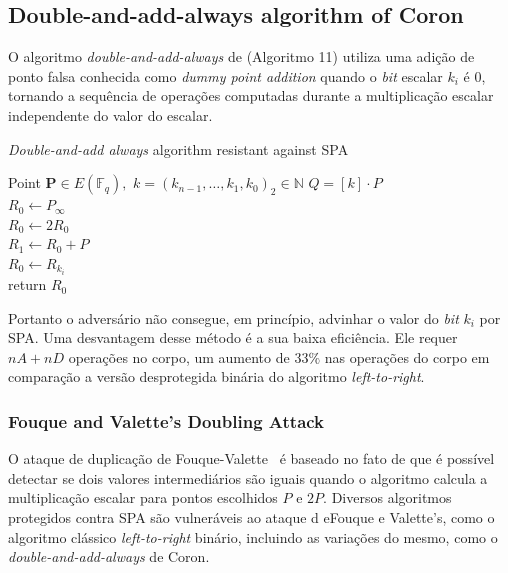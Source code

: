 
\subsection{Double-and-add-always algorithm of Coron~\cite{Coron1999}}

O algoritmo {\it double-and-add-always} de \cite{Coron1999} (Algoritmo 11) utiliza uma adição de ponto falsa conhecida como \textit{dummy point addition} quando o \textit{bit} escalar $k_i$ é $0$, tornando a sequência de operações computadas durante a multiplicação escalar independente do valor do escalar.

\begin{algorithm}[h] %
	\caption{\small{\textit{Double-and-add always} algorithm resistant against SPA}}
	\label{Double-and-add-Coron}
	\begin{algorithmic}[1]
		\REQUIRE  Point $\textbf{P} \in E(\mathbb{F}_q),$ $k=(k_{n-1},\ldots,k_1,k_0)_2 \in \mathbb{N}$
		\ENSURE  $Q=[k] \cdot P$\\
		\STATE $R_0\leftarrow P_{\infty}$   \\
		\STATE $R_0\leftarrow 2R_0$  \\
		\STATE $R_1\leftarrow R_0+P$\\ \label{Paso_R_1_Double-and-add-Coron}
		\STATE $R_0\leftarrow R_{k_i}$\label{Step5Double-and-add-Coron} \\
		\ENDFOR
		\STATE return $R_0$\\
	\end{algorithmic}
\end{algorithm}

Portanto o adversário não consegue, em princípio, advinhar o valor do \textit{bit} $k_i$ por SPA. Uma desvantagem desse método é a sua baixa eficiência. Ele requer $nA + nD$ operações no corpo, um aumento de $33\%$ nas operações do corpo em comparação a versão desprotegida binária do algoritmo \textit{left-to-right}.

\subsubsection{Fouque and Valette's Doubling Attack \cite{CHES:FouVal03}}\label{Fouque-Valette-DoublingAttack}
O ataque de duplicação de Fouque-Valette~\cite{CHES:FouVal03} é baseado no fato de que é possível detectar se dois valores intermediários são iguais quando o algoritmo calcula a multiplicação escalar para pontos escolhidos $P$ e $2P$. Diversos algoritmos protegidos contra SPA são vulneráveis ao ataque d eFouque e Valette's, como o algoritmo clássico \textit{left-to-right} binário, incluindo as variações do mesmo, como o \textit{double-and-add-always} de Coron.

